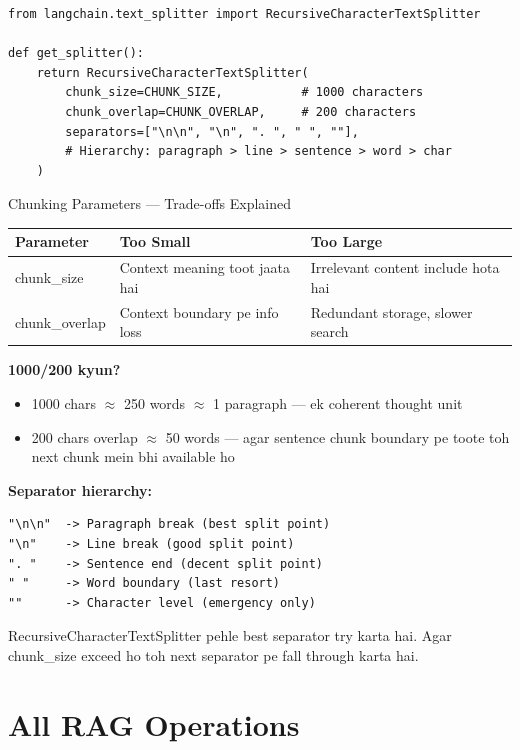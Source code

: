 \documentclass[11pt,a4paper,twoside]{report}
\begin{document}
\begin{lstlisting}[style=pythonstyle,caption={vector\_store.py --- Text Splitting}]
from langchain.text_splitter import RecursiveCharacterTextSplitter

def get_splitter():
    return RecursiveCharacterTextSplitter(
        chunk_size=CHUNK_SIZE,           # 1000 characters
        chunk_overlap=CHUNK_OVERLAP,     # 200 characters
        separators=["\n\n", "\n", ". ", " ", ""],
        # Hierarchy: paragraph > line > sentence > word > char
    )
\end{lstlisting}

\begin{conceptbox}{Chunking Parameters --- Trade-offs Explained}
\begin{center}
\begin{tabular}{|p{3cm}|p{5cm}|p{5cm}|}
\hline
\textbf{Parameter} & \textbf{Too Small} & \textbf{Too Large} \\
\hline
chunk\_size & Context meaning toot jaata hai & Irrelevant content include hota hai \\
\hline
chunk\_overlap & Context boundary pe info loss & Redundant storage, slower search \\
\hline
\end{tabular}
\end{center}

\textbf{1000/200 kyun?}
\begin{itemize}
    \item 1000 chars $\approx$ 250 words $\approx$ 1 paragraph --- ek coherent thought unit
    \item 200 chars overlap $\approx$ 50 words --- agar sentence chunk boundary pe toote toh next chunk mein bhi available ho
\end{itemize}

\textbf{Separator hierarchy:}
\begin{lstlisting}[language={}]
"\n\n"  -> Paragraph break (best split point)
"\n"    -> Line break (good split point)
". "    -> Sentence end (decent split point)
" "     -> Word boundary (last resort)
""      -> Character level (emergency only)
\end{lstlisting}
RecursiveCharacterTextSplitter pehle best separator try karta hai. Agar chunk\_size exceed ho toh next separator pe fall through karta hai.
\end{conceptbox}

\section{All RAG Operations}
\end{document}

